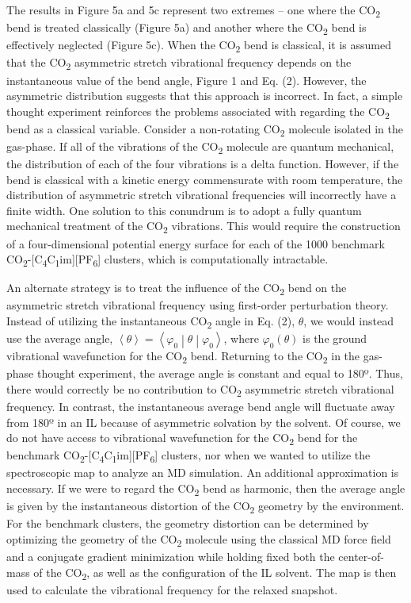 \documentclass[]{article}
\begin{document}
The results in Figure 5a and 5c represent two extremes -- one where the
CO\textsubscript{2} bend is treated classically (Figure 5a) and another
where the CO\textsubscript{2} bend is effectively neglected (Figure 5c).
When the CO\textsubscript{2} bend is classical, it is assumed that the
CO\textsubscript{2} asymmetric stretch vibrational frequency depends on
the instantaneous value of the bend angle, Figure 1 and Eq. (2).
However, the asymmetric distribution suggests that this approach is
incorrect. In fact, a simple thought experiment reinforces the problems
associated with regarding the CO\textsubscript{2} bend as a classical
variable. Consider a non-rotating CO\textsubscript{2} molecule isolated
in the gas-phase. If all of the vibrations of the CO\textsubscript{2}
molecule are quantum mechanical, the distribution of each of the four
vibrations is a delta function. However, if the bend is classical with a
kinetic energy commensurate with room temperature, the distribution of
asymmetric stretch vibrational frequencies will incorrectly have a
finite width. One solution to this conundrum is to adopt a fully quantum
mechanical treatment of the CO\textsubscript{2} vibrations. This would
require the construction of a four-dimensional potential energy surface
for each of the 1000 benchmark
CO\textsubscript{2}-{[}C\textsubscript{4}C\textsubscript{1}im{]}{[}PF\textsubscript{6}{]}
clusters, which is computationally intractable.

An alternate strategy is to treat the influence of the
CO\textsubscript{2} bend on the asymmetric stretch vibrational frequency
using first-order perturbation theory. Instead of utilizing the
instantaneous CO\textsubscript{2} angle in Eq. (2), \(\theta\), we would
instead use the average angle,
\(\left\langle \theta \right\rangle = \left\langle \varphi_{0} \middle| \theta \middle| \varphi_{0} \right\rangle\),
where \(\varphi_{0}(\theta)\) is the ground vibrational wavefunction for
the CO\textsubscript{2} bend. Returning to the CO\textsubscript{2} in
the gas-phase thought experiment, the average angle is constant and
equal to 180º. Thus, there would correctly be no contribution to
CO\textsubscript{2} asymmetric stretch vibrational frequency. In
contrast, the instantaneous average bend angle will fluctuate away from
180º in an IL because of asymmetric solvation by the solvent. Of course,
we do not have access to vibrational wavefunction for the
CO\textsubscript{2} bend for the benchmark
CO\textsubscript{2}-{[}C\textsubscript{4}C\textsubscript{1}im{]}{[}PF\textsubscript{6}{]}
clusters, nor when we wanted to utilize the spectroscopic map to analyze
an MD simulation. An additional approximation is necessary. If we were
to regard the CO\textsubscript{2} bend as harmonic, then the average
angle is given by the instantaneous distortion of the
CO\textsubscript{2} geometry by the environment. For the benchmark
clusters, the geometry distortion can be determined by optimizing the
geometry of the CO\textsubscript{2} molecule using the classical MD
force field and a conjugate gradient minimization while holding fixed
both the center-of-mass of the CO\textsubscript{2}, as well as the
configuration of the IL solvent. The map is then used to calculate the
vibrational frequency for the relaxed snapshot.
\end{document}
